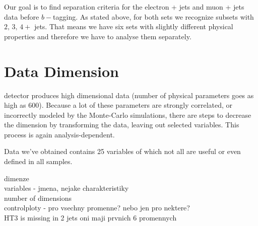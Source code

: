Our goal is to find separation criteria for the electron + jets and muon + jets data before $b-$tagging. As stated above, for both sets we recognize subsets with $2, \,3,\, 4+$ jets. That means we have six sets with slightly different physical properties and therefore we have to analyse them separately. 

\section{Data Dimension}
\dzero detector  produces high dimensional data (number of physical parameters  goes as high as $600$). Because a lot of these parameters are strongly correlated, or incorrectly modeled by the Monte-Carlo simulations, there are steps to decrease the dimension by transforming the data, leaving out selected variables. This process is again analysis-dependent.

Data we've obtained contains 25 variables of which not all are useful or even defined in all samples. 

dimenze \\
variables - jmena, nejake charakteristiky \\
number of dimensions \\
controlploty - pro vsechny promenne? nebo jen pro nektere?\\
HT3 is missing in 2 jets
oni maji prvnich 6 promennych

